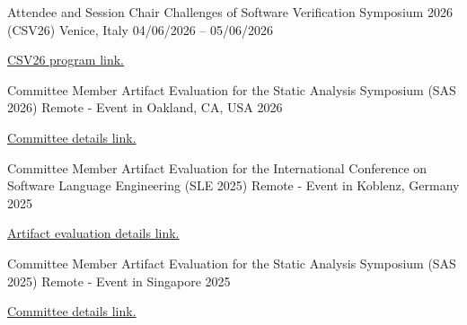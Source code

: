 
\begin{cventries}

    \cventry
        {Attendee and Session Chair} %
        {Challenges of Software Verification Symposium 2026 (CSV26)} %
        {Venice, Italy} %
        {04/06/2026 – 05/06/2026} %
        {
        \begin{cvitems} %
            \item {\href{https://unive-ssv.github.io/csv.html}{CSV26 program link.}}
        \end{cvitems}
        }

    \cventry
        {Committee Member} %
        {Artifact Evaluation for the Static Analysis Symposium (SAS 2026)} %
        {Remote - Event in Oakland, CA, USA} %
        {2026} %
        {
        \begin{cvitems} %
            \item {\href{https://conf.researchr.org/committee/splash-issta-2026/sas-2026-sas-artifact-sas-artifact-evaluation-committee}{Committee details link.}}
        \end{cvitems}
        }

    \cventry
        {Committee Member} %
        {Artifact Evaluation for the International Conference on Software Language Engineering (SLE 2025)} %
        {Remote - Event in Koblenz, Germany} %
        {2025} %
        {
        \begin{cvitems} %
            \item {\href{https://www.sleconf.org/2025/ArtifactEvaluation.html}{Artifact evaluation details link.}}
        \end{cvitems}
        }

    \cventry
        {Committee Member} %
        {Artifact Evaluation for the Static Analysis Symposium (SAS 2025)} %
        {Remote - Event in Singapore} %
        {2025} %
        {
        \begin{cvitems} %
            \item {\href{https://2025.splashcon.org/committee/sas-2025-sas-artifact-sas-artifact-evaluation-committee}{Committee details link.}}
        \end{cvitems}
        }


\end{cventries}
